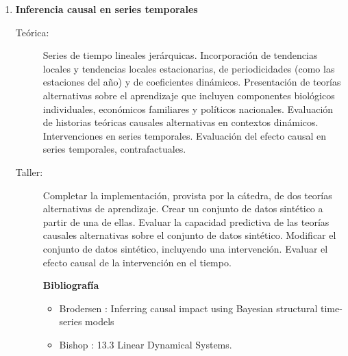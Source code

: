 \documentclass[11pt]{article}
\begin{document}
\begin{enumerate}
\item \textbf{Inferencia causal en series temporales}
\vspace{-0.15cm}
\begin{description}
\item[Teórica:]
Series de tiempo lineales jerárquicas.
Incorporación de tendencias locales y tendencias locales estacionarias, de periodicidades (como las estaciones del año) y de coeficientes dinámicos.
Presentación de teorías alternativas sobre el aprendizaje que incluyen componentes biológicos individuales, económicos familiares y políticos nacionales.
Evaluación de historias teóricas causales alternativas en contextos dinámicos.
Intervenciones en series temporales.
Evaluación del efecto causal en series temporales, contrafactuales.
\item[Taller:]
Completar la implementación, provista por la cátedra, de dos teorías alternativas de aprendizaje.
Crear un conjunto de datos sintético a partir de una de ellas.
Evaluar la capacidad predictiva de las teorías causales alternativas sobre el conjunto de datos sintético.
Modificar el conjunto de datos sintético, incluyendo una intervención.
Evaluar el efecto causal de la intervención en el tiempo.
\item[] \textbf{Bibliografía}
\begin{itemize}
\item Brodersen \cite{brodersen2015-causalTimeSeries}: Inferring causal impact using Bayesian structural time-series models
\item Bishop \cite{bishop2006-PRML}: 13.3 Linear Dynamical Systems.
\end{itemize}
\end{description}


\end{enumerate}
\end{document}
